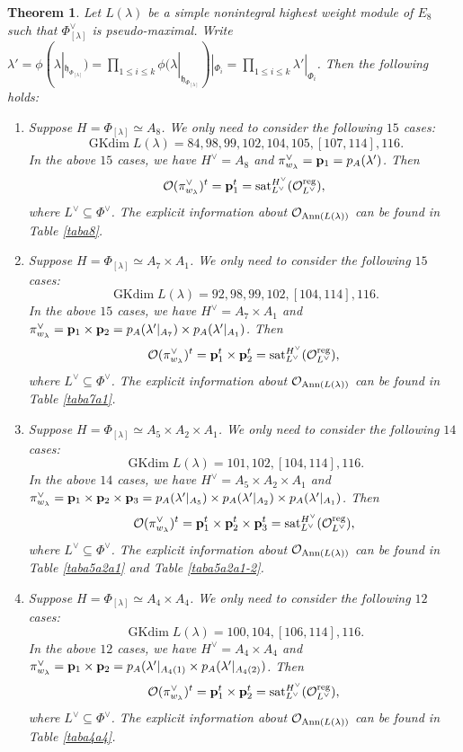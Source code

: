 \documentclass[reqno,12pt]{amsart}
\numberwithin{equation}{section}
\theoremstyle{plain}
\newtheorem{Thm}{Theorem}[section]
\theoremstyle{definition}
\newcommand{\lam}{\lambda}
\renewcommand{\subset}{\subseteq}
\newcommand{\gkd}{\operatorname{GKdim}}
\newcommand{\lest}{\leqslant}
\begin{document}
\begin{Thm}\label{e8-av}
Let $L(\lam)$ be a simple nonintegral highest weight module of $E_8$ such that $\Phi_{[\lam]}^\vee$ is pseudo-maximal. Write $\lam'=\phi(\lam|_{\mathfrak{h}_{\Phi_{[\lambda]}}})=\prod\limits_{1\lest i\lest k} \phi(\lambda|_{\mathfrak{h}_{\Phi_{[\lambda]}}})|_{{\Phi_i}}=\prod\limits_{1\lest i\lest k} \lam'|_{{\Phi_i}}$.
	Then
    the following holds:
    \begin{enumerate}
	

\item Suppose $H=\Phi_{[\lam]}\simeq A_8$. We only need to consider the following $15$ cases:
$$\gkd L(\lam)=84,98,99,102,104,105,[107,114],116.$$
In the above $15$ cases, we have $H^{\vee}= A_8$ and   
$\pi^{\vee}_{w_{\lam}}={\bf p}_{1}=p_{A}(\lam')$. Then $$\mathcal{O}(\pi^{\vee}_{w_{\lam}})^t={\bf p}_{1}^t = {\rm sat}_{L^\vee}^{H^\vee} (\mathcal{O}_{L^\vee}^{\rm reg}),$$
where $L^\vee \subset \Phi^\vee$. The explicit information about $\mathcal{O}_{{\rm Ann}(L(\lambda))}$ can be found in Table \ref{taba8}.

\item Suppose $H=\Phi_{[\lam]}\simeq A_7\times A_1$. We only need to consider the following $15$ cases:
$$\gkd L(\lam)=92,98,99,102,[104,114],116.$$
In the above $15$ cases, we have $H^{\vee}= A_7\times A_1$ and   
$\pi^{\vee}_{w_{\lam}}={\bf p}_{1}\times {\bf p}_{2}=p_{A}(\lam'|_{A_7})\times p_{A}(\lam'|_{A_1})$. Then $$\mathcal{O}(\pi^{\vee}_{w_{\lam}})^t={\bf p}_{1}^t\times {\bf p}_{2}^t = {\rm sat}_{L^\vee}^{H^\vee} (\mathcal{O}_{L^\vee}^{\rm reg}),$$
where $L^\vee \subset \Phi^\vee$. The explicit information about $\mathcal{O}_{{\rm Ann}(L(\lambda))}$ can be found in Table \ref{taba7a1}.

\item Suppose $H=\Phi_{[\lam]}\simeq A_5\times A_2 \times A_1$. We only need to consider the following $14$ cases:
$$\gkd L(\lam)=101,102,[104,114],116.$$
In the above $14$ cases, we have $H^{\vee}= A_5\times A_2\times A_1$ and   
$\pi^{\vee}_{w_{\lam}}={\bf p}_{1}\times {\bf p}_{2}\times {\bf p}_{3}=p_{A}(\lam'|_{A_5})\times p_{A}(\lam'|_{A_2})\times p_{A}(\lam'|_{A_1})$. Then $$\mathcal{O}(\pi^{\vee}_{w_{\lam}})^t={\bf p}_{1}^t\times {\bf p}_{2}^t \times {\bf p}_{3}^t = {\rm sat}_{L^\vee}^{H^\vee} (\mathcal{O}_{L^\vee}^{\rm reg}),$$
where $L^\vee \subset \Phi^\vee$. The explicit information about $\mathcal{O}_{{\rm Ann}(L(\lambda))}$ can be found in Table \ref{taba5a2a1} and Table \ref{taba5a2a1-2}.


\item Suppose $H=\Phi_{[\lam]}\simeq A_4\times A_4$. We only need to consider the following $12$ cases:
$$\gkd L(\lam)=100,104,[106,114],116.$$
In the above $12$ cases, we have $H^{\vee}= A_4\times A_4$ and   
$\pi^{\vee}_{w_{\lam}}={\bf p}_{1}\times {\bf p}_{2}=p_{A}(\lam'|_{A_4(1)}\times p_{A}(\lam'|_{A_4(2)})$. Then $$\mathcal{O}(\pi^{\vee}_{w_{\lam}})^t={\bf p}_{1}^t\times {\bf p}_{2}^t = {\rm sat}_{L^\vee}^{H^\vee} (\mathcal{O}_{L^\vee}^{\rm reg}),$$
where $L^\vee \subset \Phi^\vee$. The explicit information about $\mathcal{O}_{{\rm Ann}(L(\lambda))}$ can be found in Table \ref{taba4a4}.



\end{enumerate}
\end{Thm}
\end{document}
